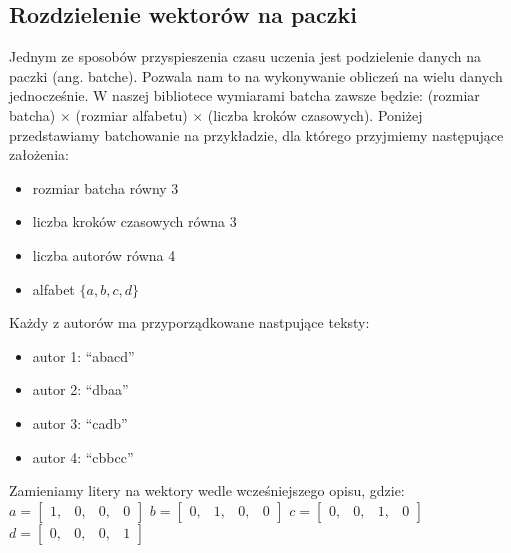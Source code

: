 \subsection{Rozdzielenie wektorów na paczki}
Jednym ze sposobów przyspieszenia czasu uczenia jest podzielenie danych na paczki (ang. batche).
Pozwala nam to na wykonywanie obliczeń na wielu danych jednocześnie. W naszej bibliotece 
wymiarami batcha zawsze będzie: (rozmiar batcha) $\times$ (rozmiar alfabetu) $\times$ (liczba kroków czasowych). 
Poniżej przedstawiamy batchowanie na przykładzie, dla którego przyjmiemy następujące założenia: 
\begin{itemize}
	\item rozmiar batcha równy 3
	\item liczba kroków czasowych równa 3
	\item liczba autorów równa 4
	\item alfabet $\{a,b,c,d\}$
\end{itemize}

Każdy z autorów ma przyporządkowane nastpujące teksty:
\begin{itemize}
	\item autor 1: ``abacd''
	\item autor 2: ``dbaa''
	\item autor 3: ``cadb''
	\item autor 4: ``cbbcc''
\end{itemize}

Zamieniamy litery na wektory wedle wcześniejszego opisu, gdzie:
\vspace{3mm}
\newline 
$
a =
\begin{bmatrix} 
1, & 0, & 0, & 0
\end{bmatrix} 
$
\vspace{3mm}
\newline
$
b = 
\begin{bmatrix} 
0, & 1, & 0, & 0
\end{bmatrix} 
$
\vspace{3mm}
\newline 
$
c =
\begin{bmatrix} 
0, & 0, & 1, & 0
\end{bmatrix} 
$
\vspace{3mm}
\newline 
$
d =
\begin{bmatrix} 
0, & 0, & 0, & 1
\end{bmatrix} 
$
\vspace{1mm}
\newline 

